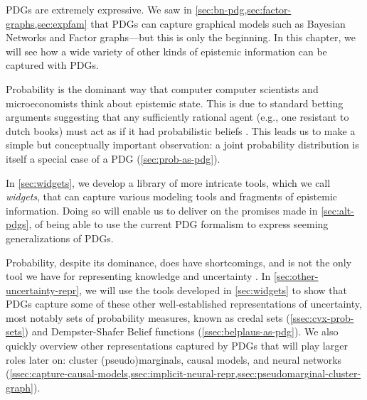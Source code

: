     \label{chap:repr-tools}

PDGs are extremely expressive.
We saw in \cref{sec:bn-pdg,sec:factor-graphs,sec:expfam} that PDGs
can capture graphical models such as Bayesian Networks and Factor graphs---but this is only the beginning. 
%
In this chapter, we will see how a wide variety of other kinds of epistemic information can be captured with PDGs.


Probability is the dominant way that computer computer scientists and
micro\-economists think about epistemic state.
This is due to standard betting arguments suggesting that any sufficiently rational agent (e.g., one resistant to dutch books)
must act as if it had probabilistic beliefs \citep{..,savage}.
This leads us to make a simple but conceptually important observation: a joint probability distribution is itself a special case of a PDG (\cref{sec:prob-as-pdg}). 
%
%

In \cref{sec:widgets}, we develop a library of more intricate tools, which we call \emph{widgets}, that can capture various modeling tools and fragments of epistemic information.
%
Doing so will enable us to deliver on the promises made in \cref{sec:alt-pdgs}, of being able to use the current PDG formalism to express seeming generalizations of PDGs. 

Probability, despite its dominance, does have shortcomings, and is not the only tool we have for representing knowledge and uncertainty \citep[\S2]{halpern-RAU}.
In \cref{sec:other-uncertainty-repr}, we will use the tools developed in \cref{sec:widgets} to show that PDGs capture some of these other well-established representations of uncertainty, most notably sets of probability measures, known as credal sets \citep{Walley1991-SRIP} (\cref{ssec:cvx-prob-sets}) and Dempster-Shafer Belief functions \citep{shafer1976mathematical} (\cref{ssec:belplaus-as-pdg}).
We also quickly overview other representations captured by PDGs that will play larger roles later on: cluster (pseudo)marginals, causal models, and neural networks (\cref{ssec:capture-causal-models,ssec:implicit-neural-repr,ssec:pseudomarginal-cluster-graph}). 

